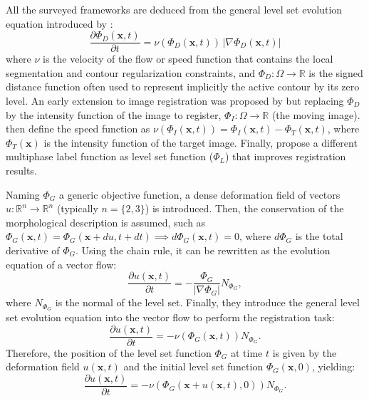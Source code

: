 All the surveyed frameworks are deduced from the general level set evolution equation
introduced by \citep{osher_fronts_1988}:
\begin{equation}
\frac{\partial \Phi_D(\mathbf{x},t)}{\partial t} = \nu ( \Phi_D(\mathbf{x},t)) \, \left| \nabla \Phi_D(\mathbf{x},t) \right|
\end{equation}
where $\nu$ is the velocity of the flow or speed function that contains the local
segmentation and contour regularization constraints, and $\Phi_D: \Omega \to \mathbb{R}$
is the signed distance function often used to represent implicitly the active contour
by its zero level. An early extension to image registration was proposed by 
\citep{vemuri_joint_2003} but replacing $\Phi_D$ by the intensity function of the
image to register, $\Phi_I: \Omega \to \mathbb{R}$ (the moving image). 
\citep{bertalmio_morphing_2000,vemuri_joint_2003} then define the speed function as
$\nu(\Phi_I(\mathbf{x},t)) = \Phi_I(\mathbf{x},t) - \Phi_T(\mathbf{x},t)$, where $\Phi_T(\mathbf{x})$ is the intensity
function of the target image. Finally, \citep{gorthi_active_2011} propose a different
multiphase label function as level set function ($\Phi_L$) that improves registration
results.

Naming $\Phi_G$ a generic objective function, a dense deformation field of vectors 
$u: \mathbb{R}^n \to \mathbb{R}^n$ (typically $n = \{ 2, 3 \}$) is introduced. 
Then, the conservation of the morphological description is assumed, such as
$\Phi_G(\mathbf{x},t) = \Phi_G( \mathbf{x} + du, t + dt ) \implies d\Phi_G(\mathbf{x},t) = 0$, where $d\Phi_G$ is
the total derivative of $\Phi_G$. Using the chain rule, it can be rewritten as the 
evolution equation of a vector flow:
\begin{equation}
\frac{\partial u(\mathbf{x},t)}{\partial t}= - \frac{\Phi_G}{\left| \nabla \Phi_G \right|} N_{\Phi_G},
\end{equation}
where $N_{\Phi_G}$ is the normal of the level set. Finally, they introduce the general
level set evolution equation into the vector flow to perform the registration task:
\begin{equation}
\frac{\partial u(\mathbf{x},t)}{\partial t} = - \nu( \Phi_G(\mathbf{x},t) ) N_{\Phi_G}.
\end{equation}
Therefore, the position of the level set function $\Phi_G$ at time $t$ is given by the
deformation field $u(\mathbf{x},t)$ and the initial level set function $\Phi_G(\mathbf{x},0)$, yielding:
\begin{equation}
\frac{\partial u(\mathbf{x},t)}{\partial t} = - \nu( \Phi_G(\mathbf{x} + u(\mathbf{x},t), 0) ) N_{\Phi_G}.
\label{eq:active_deformation_fields}
\end{equation}

